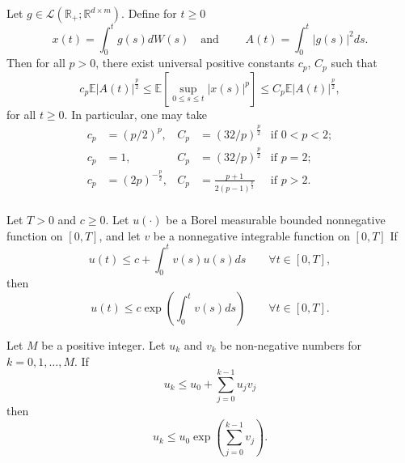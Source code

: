 \documentclass[sort&compress, preprint]{elsarticle}
\theoremstyle{definition}
\theoremstyle{plain}%
\theoremstyle{remark}
\newcommand{\m}[1]{\mathbb{E}#1}
\begin{document}
\begin{appendices}
\begin{bdg}
	Let $g\in \mathcal{L}(\mathbb{R}_+; \mathbb{R}^{d\times m})$. Define for $t\geq 0$
	\begin{equation}
		\label{thm:BDG}
		x(t) = \int_{0}^{t} g(s)dW(s) \quad \text{and } \qquad 
		A(t) = \int_{0}^{t} |g(s)|^2 ds.
	\end{equation}
	Then for all $p>0$, there exist universal positive constants $c_p$, $C_p$ such that
	\begin{equation}
		c_p\m|{A(t)}|^{\frac{p}{2}}
		\leq
		\m \left[
		\sup_{0\leq s \leq t} |x(s)|^p
		\right]
		\leq 
		C_p \m |A(t)|^{\frac{p}{2}},
	\end{equation}
	for all $t\geq 0$.  In particular, one may take
	\begin{align*}
	c_p &= (p/2)^p, & 			 C_p &= (32/p)^{\frac{p}{2}} & \text{if } 0<p<2; \\
	c_p &= 1,       & 			 C_p &= (32/p)^{\frac{p}{2}} & \text{if } p=2; \\
	c_p &= (2p)^{-\frac{p}{2}},& C_p &= \frac{p+1}{2(p-1)^{\frac{p}{2}}} & \text{if } p>2 .\\
	\end{align*}
\end{bdg}

\begin{Gronwall}
	Let $T > 0$ and $c \geq 0$. Let $u(\cdot)$ be a Borel measurable bounded nonnegative function on 
	$[0,T]$, and let $v$ be a nonnegative integrable function on $[0,T]$
	If
	$$
		u(t) \leq c 
		+\int_{0}^{t} v(s)u(s)ds \qquad \forall t \in [0,T],
	$$
	then
	\begin{equation}\label{thm:Gronwall}
		u(t) \leq c\exp
		\left(
		\int_{0}^{t} v(s)ds 
		\right)
		\qquad \forall t \in [0,T].
	\end{equation}
\end{Gronwall}
%
\begin{DiscreteGronwall}
	Let $M$ be a positive integer. Let $u_k$ and $v_k$ be non-negative numbers for $k=0,1,\dots,M$. 
	If
	$$
	u_k\leq u_0 + \sum_{j=0}^{k-1} u_j v_j
	$$
	then
	\begin{equation}
		\label{thm:DiscreteGronwall}
		u_k \leq u_0 
		\exp
		\left(
		\sum_{j=0}^{k-1}v_j
		\right).
	\end{equation}
\end{DiscreteGronwall}
\end{appendices}
\end{document}
